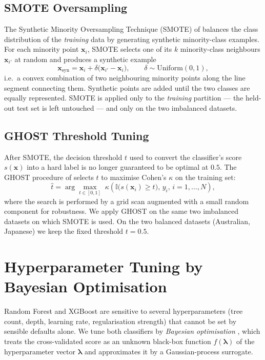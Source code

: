 \subsection{SMOTE Oversampling}

The Synthetic Minority Oversampling Technique (SMOTE) of
\citet{chawla2002smote} balances the class distribution of the
\emph{training} data by generating synthetic minority-class examples.
For each minority point $\mathbf{x}_i$, SMOTE selects one of its
$k$ minority-class neighbours $\mathbf{x}_{i'}$ at random and produces
a synthetic example
\begin{equation}
\mathbf{x}_{\mathrm{syn}}
=
\mathbf{x}_i
+
\delta\bigl(\mathbf{x}_{i'}-\mathbf{x}_i\bigr),
\qquad
\delta\sim\mathrm{Uniform}(0,1),
\tag{3.1}
\label{eq:smote}
\end{equation}
i.e.\ a convex combination of two neighbouring minority points along
the line segment connecting them. Synthetic points are added until
the two classes are equally represented. SMOTE is applied only to
the \emph{training} partition --- the held-out test set is left
untouched --- and only on the two imbalanced datasets.

\subsection{GHOST Threshold Tuning}

After SMOTE, the decision threshold $t$ used to convert the
classifier's score $s(\mathbf{x})$ into a hard label is no longer
guaranteed to be optimal at $0.5$. The GHOST procedure of
\citet{esposito2021ghost} selects $t$ to maximise Cohen's $\kappa$
on the training set:
\begin{equation}
\hat t
=
\arg\max_{t\in[0,1]}
\;
\kappa\!\left(
\mathbb{I}\bigl(s(\mathbf{x}_i)\geq t\bigr),\,y_i,\,i=1,\ldots,N
\right),
\tag{3.2}
\label{eq:ghost}
\end{equation}
where the search is performed by a grid scan augmented with a small
random component for robustness. We apply GHOST on the same two
imbalanced datasets on which SMOTE is used. On the two balanced
datasets (Australian, Japanese) we keep the fixed threshold
$t = 0.5$.

\section{Hyperparameter Tuning by Bayesian Optimisation}
\label{sec:bayes}

Random Forest and XGBoost are sensitive to several hyperparameters
(tree count, depth, learning rate, regularisation strength) that
cannot be set by sensible defaults alone. We tune both classifiers
by \emph{Bayesian optimisation} \citep{snoek2012practical}, which
treats the cross-validated score as an unknown black-box function
$f(\boldsymbol{\lambda})$ of the hyperparameter vector
$\boldsymbol{\lambda}$ and approximates it by a Gaussian-process
surrogate.

